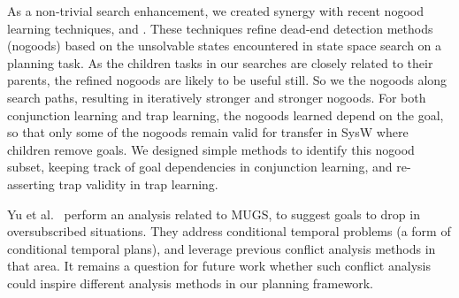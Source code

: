 As a non-trivial search enhancement, we created synergy with recent
nogood learning techniques, 
\cite{steinmetz:hoffmann:ai-17} and 
\cite{steinmetz:hoffmann:ijcai-17}. These techniques refine dead-end
detection methods (nogoods) based on the unsolvable states encountered
in state space search on a planning task. As the children tasks in our
searches are closely related to their parents, the refined nogoods are
likely to be useful still. So we  the nogoods along
search paths, resulting in iteratively stronger and stronger
nogoods. For both conjunction learning and trap learning, the nogoods
learned depend on the goal, so that only some of the nogoods remain
valid for transfer in SysW where children remove goals. We designed
simple methods to identify this nogood subset, keeping track of goal
dependencies in conjunction learning, and re-asserting trap validity
in trap learning.
%
%

Yu et al.\  perform an analysis related to
MUGS, to suggest goals to drop in oversubscribed situations. They
address conditional temporal problems (a form of conditional temporal
plans), and leverage previous conflict analysis methods in that
area. It remains a question for future work whether such conflict
analysis could inspire different analysis methods in our planning
framework.










